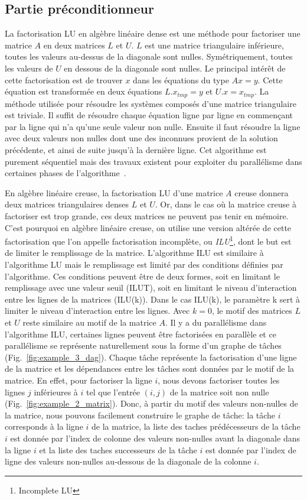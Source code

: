 \subsection{Partie préconditionneur}
La factorisation LU en algèbre linéaire dense est une méthode pour factoriser une matrice $A$ en deux matrices $L$ et $U$.
%
$L$ est une matrice triangulaire inférieure, toutes les valeurs au-dessus de la diagonale sont nulles.
%
Symétriquement, toutes les valeurs de $U$ en dessous de la diagonale sont nulles.
%
Le principal intérêt de cette factorisation est de trouver $x$ dans les équations du type $Ax=y$.
%
Cette équation est transformée en deux équations $L.x_{tmp}=y$ et $U.x=x_{tmp}$.
%
La méthode utilisée pour résoudre les systèmes composés d'une matrice triangulaire est triviale.
%
Il suffit de résoudre chaque équation ligne par ligne en commençant par la ligne qui n'a qu'une seule valeur non nulle.
%
Ensuite il faut résoudre la ligne avec deux valeurs non nulles dont une des inconnues provient de la solution précédente, et ainsi de suite jusqu'à la dernière ligne.
%
Cet algorithme est purement séquentiel mais des travaux existent pour exploiter du parallélisme dans certaines phases de l'algorithme~\cite{plasma_lu}.



En algèbre linéaire creuse, la factorisation LU d'une matrice $A$ creuse donnera deux matrices triangulaires denses $L$ et $U$.
%
Or, dans le cas où la matrice creuse à factoriser est trop grande, ces deux matrices ne peuvent pas tenir en mémoire.
%
C'est pourquoi en algèbre linéaire creuse, on utilise une version altérée de cette factorisation que l'on appelle factorisation incomplète, ou {\em ILU}\footnote{Incomplete LU}, dont le but est de limiter le remplissage de la matrice.
%
L'algorithme ILU est similaire à l'algorithme LU mais le remplissage est limité par des conditions définies par l'algorithme.
%
Ces conditions peuvent être de deux formes, soit en limitant le remplissage avec une valeur seuil (ILUT), soit en limitant le niveau d'interaction entre les lignes de la matrices (ILU(k)).
%
Dans le cas ILU(k), le paramètre k sert à limiter le niveau d'interaction entre les lignes.
%
Avec $k=0$, le motif des matrices $L$ et $U$ reste similaire au motif de la matrice $A$.
%
Il y a du parallélisme dans l'algorithme ILU, certaines lignes peuvent être factorisées en parallèle et ce parallélisme se représente naturellement sous la forme d'un graphe de tâches (Fig.~\ref{fig:example_3_dag}).
%
Chaque tâche représente la factorisation d'une ligne de la matrice et les dépendances entre les tâches sont données par le motif de la matrice.
%
En effet, pour factoriser la ligne $i$, nous devons factoriser toutes les lignes $j$ inférieures à $i$ tel que l'entrée $(i,j)$ de la matrice soit non nulle (Fig.~\ref{fig:example_2_matrix}).
%
Donc, à partir du motif des valeurs non-nulles de la matrice, nous pouvons facilement construire le graphe de tâche:
%
la tâche $i$ corresponds à la ligne $i$ de la matrice, la liste des taches prédécesseurs de la tâche $i$ est donnée par l'index de colonne des valeurs non-nulles avant la diagonale dans la ligne $i$ et la liste des taches successeurs de la tâche $i$ est donnée par l'index de ligne des valeurs non-nulles au-dessous de la diagonale de la colonne $i$.

